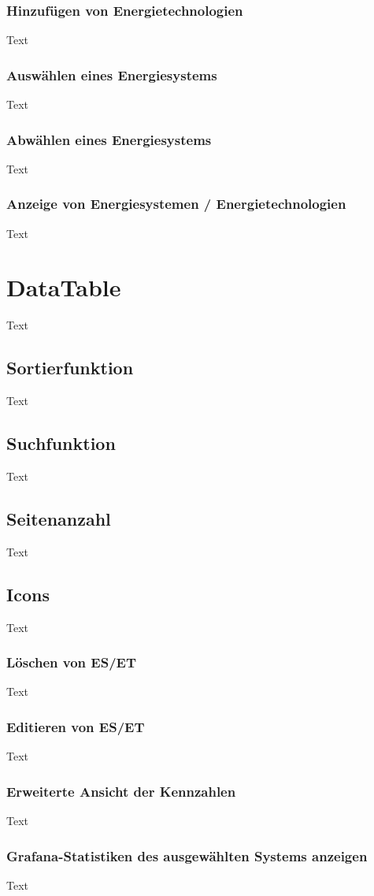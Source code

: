 \subsubsection{Hinzufügen von Energietechnologien}
Text
\subsubsection{Auswählen eines Energiesystems}
Text
\subsubsection{Abwählen eines Energiesystems}
Text
\subsubsection{Anzeige von Energiesystemen / Energietechnologien}
Text


\section{DataTable}
Text
\subsection{Sortierfunktion}
Text
\subsection{Suchfunktion}
Text
\subsection{Seitenanzahl}
Text
\subsection{Icons}
Text
\subsubsection{Löschen von ES/ET}
Text
\subsubsection{Editieren von ES/ET}
Text
\subsubsection{Erweiterte Ansicht der Kennzahlen}
Text
\subsubsection{Grafana-Statistiken des ausgewählten Systems anzeigen}
Text



